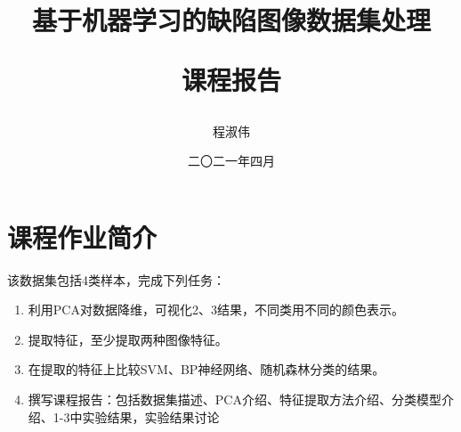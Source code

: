 \documentclass{HEBUTMaster}   %
\begin{document}
 

\title{基于机器学习的缺陷图像数据集处理

课程报告}

\author{程淑伟}



\date{二〇二一年四月} %

\maketitle
\frontmatter
{}               %

\cleardoublepage
\newpage  \pagestyle{fancy} \fancyfancy

\tableofcontents
\mainmatter %
\baselineskip=20pt  %


\chapter{课程作业简介}

该数据集包括4类样本，完成下列任务：
\begin{enumerate}[(1)]
  \item  利用PCA对数据降维，可视化2、3结果，不同类用不同的颜色表示。
  \item  提取特征，至少提取两种图像特征。
  \item  在提取的特征上比较SVM、BP神经网络、随机森林分类的结果。
  \item  撰写课程报告：包括数据集描述、PCA介绍、特征提取方法介绍、分类模型介绍、1-3中实验结果，实验结果讨论
\end{enumerate}
\end{document}
